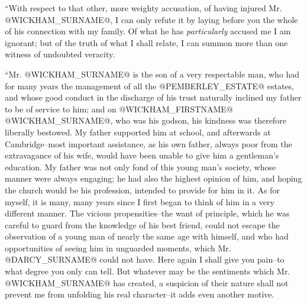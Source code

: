 ``With respect to that other, more weighty accusation, of having injured
Mr. @WICKHAM_SURNAME@, I can only refute it by laying before you the whole of his
connection with my family. Of what he has \textit{particularly} accused me I
am ignorant; but of the truth of what I shall relate, I can summon more
than one witness of undoubted veracity.

``Mr. @WICKHAM_SURNAME@ is the son of a very respectable man, who had for many
years the management of all the @PEMBERLEY_ESTATE@ estates, and whose good
conduct in the discharge of his trust naturally inclined my father to
be of service to him; and on @WICKHAM_FIRSTNAME@ @WICKHAM_SURNAME@, who was his godson, his
kindness was therefore liberally bestowed. My father supported him at
school, and afterwards at Cambridge--most important assistance, as his
own father, always poor from the extravagance of his wife, would have
been unable to give him a gentleman's education. My father was not only
fond of this young man's society, whose manner were always engaging; he
had also the highest opinion of him, and hoping the church would be
his profession, intended to provide for him in it. As for myself, it is
many, many years since I first began to think of him in a very different
manner. The vicious propensities--the want of principle, which he was
careful to guard from the knowledge of his best friend, could not escape
the observation of a young man of nearly the same age with himself,
and who had opportunities of seeing him in unguarded moments, which Mr.
@DARCY_SURNAME@ could not have. Here again I shall give you pain--to what degree
you only can tell. But whatever may be the sentiments which Mr. @WICKHAM_SURNAME@
has created, a suspicion of their nature shall not prevent me from
unfolding his real character--it adds even another motive.

